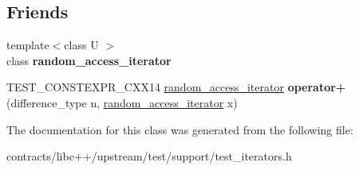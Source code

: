 \subsection*{Friends}
\begin{DoxyCompactItemize}
\item 
\mbox{\label{classrandom__access__iterator_a9068401a5d60f0341a20048b1ef37193}} 
{\footnotesize template$<$class U $>$ }\\class {\bfseries random\+\_\+access\+\_\+iterator}
\item 
\mbox{\label{classrandom__access__iterator_ac469e6153958b31a830efa4f8e3fd793}} 
T\+E\+S\+T\+\_\+\+C\+O\+N\+S\+T\+E\+X\+P\+R\+\_\+\+C\+X\+X14 \mbox{\hyperlink{classrandom__access__iterator}{random\+\_\+access\+\_\+iterator}} {\bfseries operator+} (difference\+\_\+type n, \mbox{\hyperlink{classrandom__access__iterator}{random\+\_\+access\+\_\+iterator}} x)
\end{DoxyCompactItemize}


The documentation for this class was generated from the following file\+:\begin{DoxyCompactItemize}
\item 
contracts/libc++/upstream/test/support/test\+\_\+iterators.\+h\end{DoxyCompactItemize}
